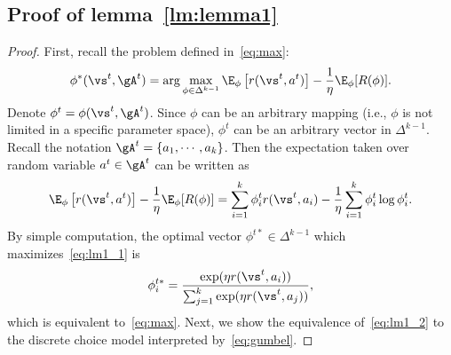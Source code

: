 \documentclass{article} %
\newcommand{\Li}[1]{{\color{cyan}{\bf\sf [Li: #1]}}}
\begin{document}
\subsection{Proof of lemma~\ref{lm:lemma1}}
\primelemma*
\begin{proof}
First, recall the problem defined in~\eqref{eq:max}:
\[
\phi^*(\vs^t,\gA^t) = \arg\max_{\phi \in \Delta^{k-1}} \E_{\phi} \left[r(\vs^t, a^t) \right] -\frac{1}{\eta}\E_{\phi}[R(\phi)].
\]
Denote $\phi^t = \phi(\vs^t,\gA^t)$. Since $\phi$ can be an arbitrary mapping (i.e., $\phi$ is not limited in a specific parameter space), $\phi^t$ can be an arbitrary vector in $\Delta^{k-1}$. Recall the notation $\gA^t = \{a_1,\cdots, a_k\}$. Then the expectation taken over random variable $a^t\in \gA^t$ can be written as
\begin{equation}\label{eq:lm1_1}
     \E_{\phi} \left[r(\vs^t, a^t) \right] -\frac{1}{\eta}\E_{\phi}[R(\phi)] =\sum_{i=1}^k \phi_i^tr(\vs^t, a_i) -\frac{1}{\eta} \sum_{i=1}^k \phi_i^t \log \phi_i^t.
\end{equation}
By simple computation, the optimal vector $\phi^{t*}\in \Delta^{k-1}$ which maximizes~\eqref{eq:lm1_1} is
\begin{equation}\label{eq:lm1_2}
    \phi_i^{t*} =\dfrac{\exp(\eta r(\vs^t, a_i))}{\sum_{j=1}^{k}\exp(\eta r(\vs^t, a_j))},
\end{equation}
\Li{fix the typo in above equation.}
which is equivalent to~\eqref{eq:max}. Next, we show the equivalence of~\eqref{eq:lm1_2} to the discrete choice model interpreted by~\eqref{eq:gumbel}.


\end{proof}
\end{document}

